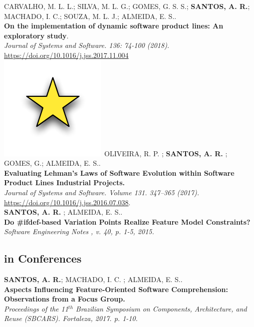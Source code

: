 \documentclass[nocolors]{friggeri-cv-a4}
\begin{document}
CARVALHO, M. L. L.; SILVA, M. L. G.; GOMES, G. S. S.; \textbf{SANTOS, A. R.}; MACHADO, I. C.; SOUZA, M. L. J.; ALMEIDA, E. S..\\
\textbf{On the implementation of dynamic software product lines: An exploratory study}.\\
\emph{Journal of Systems and Software. 136: 74-100 (2018).} \\
\url{https://doi.org/10.1016/j.jss.2017.11.004}\\

\includegraphics[scale=0.15]{img/star.pdf}~OLIVEIRA, R. P. ; \textbf{SANTOS, A. R.} ; GOMES, G.; ALMEIDA, E. S..\\
\textbf{Evaluating Lehman's Laws of Software Evolution within Software Product Lines Industrial Projects.}\\
\emph{Journal of Systems and Software. Volume 131. 347--365 (2017).}\\
\url{https://doi.org/10.1016/j.jss.2016.07.038}.\\

\textbf{SANTOS, A. R.} ; ALMEIDA, E. S.. \\
\textbf{Do \#ifdef-based Variation Points Realize Feature Model Constraints?}\\
\emph{Software Engineering Notes , v. 40, p. 1-5, 2015.}\\


\subsection{in Conferences}

\textbf{SANTOS, A. R.}; MACHADO, I. C. ; ALMEIDA, E. S..\\
\textbf{Aspects Influencing Feature-Oriented Software Comprehension: Observations from a Focus Group.} \\
\emph{Proceedings of the 11$^{th}$ Brazilian Symposium on Components, Architecture, and Reuse (SBCARS). Fortaleza, 2017. p. 1-10.}\\
\end{document}
